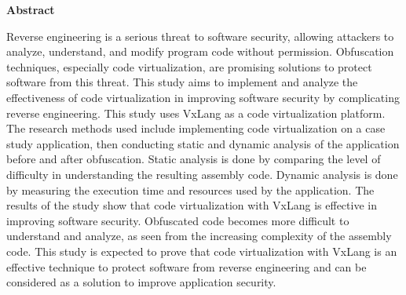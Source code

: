 \begin{center}
    \fontsize{12}{14.4}\selectfont\textbf{Abstract} %
\end{center}
\fontsize{10}{12}\selectfont %
Reverse engineering is a serious threat to software security, allowing attackers to analyze, understand, and modify program code without permission. Obfuscation techniques, especially code virtualization, are promising solutions to protect software from this threat. This study aims to implement and analyze the effectiveness of code virtualization in improving software security by complicating reverse engineering. This study uses VxLang as a code virtualization platform. The research methods used include implementing code virtualization on a case study application, then conducting static and dynamic analysis of the application before and after obfuscation. Static analysis is done by comparing the level of difficulty in understanding the resulting assembly code. Dynamic analysis is done by measuring the execution time and resources used by the application. The results of the study show that code virtualization with VxLang is effective in improving software security. Obfuscated code becomes more difficult to understand and analyze, as seen from the increasing complexity of the assembly code. This study is expected to prove that code virtualization with VxLang is an effective technique to protect software from reverse engineering and can be considered as a solution to improve application security.
\vspace{0.5cm}
